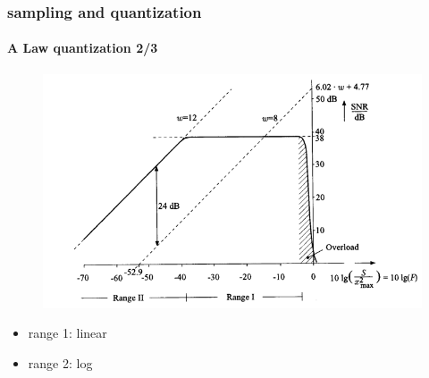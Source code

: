 	\begin{frame}\frametitle{sampling and quantization}\framesubtitle{A Law quantization 2/3}
	    \vspace{-5mm}
        \begin{figure}
			\centering
				\includegraphics[scale=0.5]{Graph/snr_a-law}
		\end{figure}
        \begin{itemize}
            \item   range 1: linear
            \item   range 2: log
        \end{itemize}
	\end{frame}
